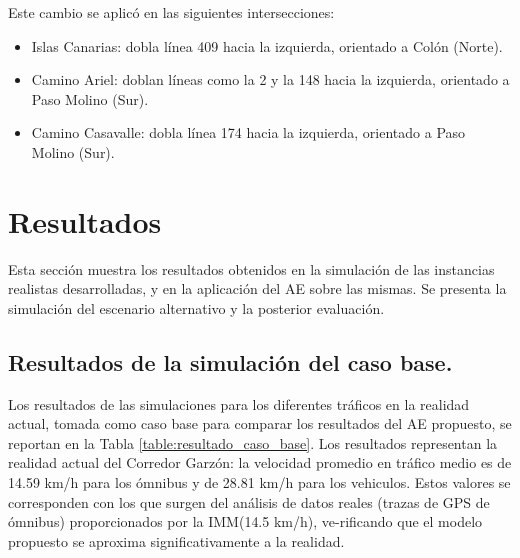 Este cambio se aplicó en las siguientes intersecciones:
\begin{itemize}
	\item Islas Canarias: dobla línea 409 hacia la izquierda, orientado a Colón (Norte).
	\item Camino Ariel: doblan líneas como la  2 y la 148 hacia la izquierda, orientado a Paso Molino (Sur). 
	\item Camino Casavalle: dobla línea 174 hacia la izquierda, orientado a Paso Molino (Sur). 
\end{itemize}

\section{Resultados}
Esta sección muestra los resultados obtenidos en la simulación de las instancias realistas desarrolladas, y en la aplicación del AE sobre las mismas. Se presenta la simulación del escenario alternativo y la posterior evaluación. %


\subsection{Resultados de la simulación del caso base.}

Los resultados de las simulaciones para los diferentes tráficos en la realidad actual, tomada como caso base para comparar los resultados del AE propuesto, se reportan en la Tabla \ref{table:resultado_caso_base}. Los resultados representan la realidad actual del Corredor Garzón: la velocidad promedio en tráfico medio es de 14.59 km/h para los ómnibus y de 28.81 km/h para los vehiculos. Estos valores se corresponden con los que surgen del análisis de datos reales (trazas de GPS de ómnibus) proporcionados por la IMM(14.5 km/h), ve-rificando que el modelo propuesto se aproxima significativamente a la realidad.

 
